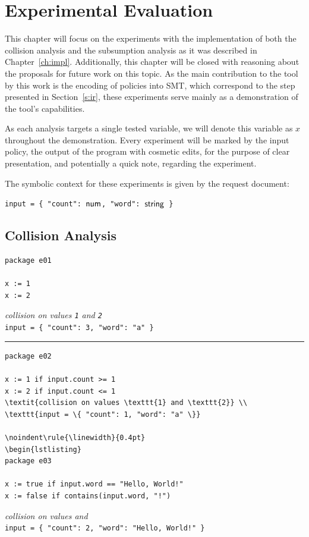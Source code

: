 \chapter{Experimental Evaluation}
\label{ch:eval}

This chapter will focus on the experiments with the implementation of both the collision analysis and the subsumption analysis as it was described in Chapter~\ref{ch:impl}.
Additionally, this chapter will be closed with reasoning about the proposals for future work on this topic.
As the main contribution to the tool by this work is the encoding of \rego policies into SMT, which correspond to the step presented in Section~\ref{s:ir}, these experiments serve mainly as a demonstration of the tool's capabilities.

As each analysis targets a single tested variable, we will denote this variable as $x$ throughout the demonstration.
Every experiment will be marked by the input \rego policy, the output of the program with cosmetic edits, for the purpose of clear presentation, and potentially a quick note, regarding the experiment.

The symbolic context for these experiments is given by the request document:
\begin{center}
\texttt{input = \{ "count": $\mathsf{num}$, "word": $\mathsf{string}$ \}}
\end{center}

\section{Collision Analysis}

\begin{lstlisting}
package e01

x := 1
x := 2
\end{lstlisting}
\textit{collision on values \texttt{1} and \texttt{2}} \\
\texttt{input = \{ "count": 3, "word": "a" \}}

\noindent\rule{\linewidth}{0.4pt}
\begin{lstlisting}
package e02

x := 1 if input.count >= 1
x := 2 if input.count <= 1
\textit{collision on values \texttt{1} and \texttt{2}} \\
\texttt{input = \{ "count": 1, "word": "a" \}}

\noindent\rule{\linewidth}{0.4pt}
\begin{lstlisting}
package e03

x := true if input.word == "Hello, World!"
x := false if contains(input.word, "!")
\end{lstlisting}
\textit{collision on values \true and \false} \\
\texttt{input = \{ "count": 2, "word": "Hello, World!" \}}

